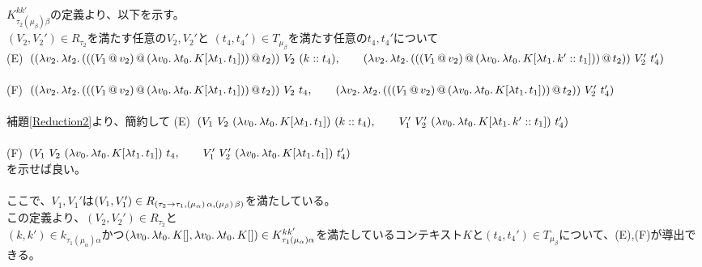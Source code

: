 \documentclass[japanese,draft]{jssst_ppl} %
\begin{document}
   \\
   $K^{kk'}_{\tau_2(\mu_{\beta})\beta}$の定義より、以下を示す。\\
   $(V_2,V_2')\in R_{\tau_2}$を満たす任意の$V_2,V_2'$と $(t_4, t_4')\in T_{\mu_{\beta}}$を満たす任意の$t_4, t_4'$について\\
   (E)\ $(\LamP{v_2}{\Lam{t_2}
                {\AppP{\AppP{\AppP{V_1}{v_2}}
                    {\LamP{v_0}{\Lam{t_0}
                        {K[\Lam{t_1}{t_1}]}}}}{t_2}}}\ V_2\ (\Cons{k}{t_4}),\\
   \qquad \LamP{v_2}{\Lam{t_2}
                {\AppP{\AppP{\AppP{V_1}{v_2}}
                    {\LamP{v_0}{\Lam{t_0}
                        {K[\Lam{t_1}{\Cons{k'}{t_1}}]}}}}{t_2}}}\ V_2'\ t_4')$\\
   \\
   (F)\ $(\LamP{v_2}{\Lam{t_2}
                {\AppP{\AppP{\AppP{V_1}{v_2}}
                    {\LamP{v_0}{\Lam{t_0}
                        {K[\Lam{t_1}{t_1}]}}}}{t_2}}}\ V_2\ t_4,\\
   \qquad \LamP{v_2}{\Lam{t_2}
                {\AppP{\AppP{\AppP{V_1}{v_2}}
                    {\LamP{v_0}{\Lam{t_0}
                        {K[\Lam{t_1}{t_1}]}}}}{t_2}}}\ V_2'\ t_4')$\\
   \\
   補題\ref{Reduction2}より、簡約して
   (E)\ $(V_1\ V_2\ \LamP{v_0}{\Lam{t_0}{K[\Lam{t_1}{t_1}]}}\ (\Cons{k}{t_4}),\\
   \qquad V_1'\ V_2'\ \LamP{v_0}{\Lam{t_0}{K[\Lam{t_1}{\Cons{k'}{t_1}}]}}\ t_4')$\\
   \\
   (F)\ $(V_1\ V_2\ \LamP{v_0}{\Lam{t_0}{K[\Lam{t_1}{t_1}]}}\ t_4,\\
   \qquad V_1'\ V_2'\ \LamP{v_0}{\Lam{t_0}{K[\Lam{t_1}{t_1}]}}\ t_4')$\\
   を示せば良い。\\
   \\
   ここで、$V_1,V_1'$は$(V_1,V_1')\in R_{(\tau_2\rightarrow{\tau_1},(\mu_{\alpha})\,\alpha,(\mu_{\beta})\,\beta)}$を満たしている。\\
   この定義より、$(V_2,V_2')\in R_{\tau_2}$と\\
   $(k,k')\in k_{\tau_1(\mu_{\alpha})\alpha}$かつ$(\lambda{v_0}.\,{\lambda{t_0}.\,{K[]}}, \lambda{v_0}.\,{\lambda{t_0}.\,{K[]}})\in  K^{kk'}_{\tau_1(\mu_{\alpha})\alpha}$を満たしているコンテキスト$K$と$(t_4, t_4')\in T_{\mu_{\beta}}$について、(E),(F)が導出できる。\\
\\
\\
\end{document}
